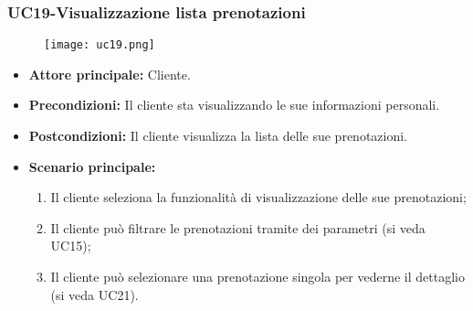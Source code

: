 \subsubsection{UC19-Visualizzazione lista prenotazioni}
\begin{figure}[h] \texttt{[image: uc19.png]} \end{figure}
\begin{itemize}
    \item \textbf{Attore principale: } Cliente.
    \item \textbf{Precondizioni: }Il cliente sta visualizzando le sue informazioni personali.
    \item \textbf{Postcondizioni: }Il cliente visualizza la lista delle sue prenotazioni.
    \item \textbf{Scenario principale:}
        \begin{enumerate}
            \item Il cliente seleziona la funzionalità di visualizzazione delle sue prenotazioni;
            \item Il cliente può filtrare le prenotazioni tramite dei parametri (si veda UC15);
            \item Il cliente può selezionare una prenotazione singola per vederne il dettaglio (si veda UC21).
        \end{enumerate}
\end{itemize}

\pagebreak
